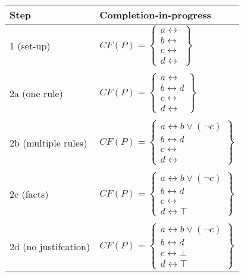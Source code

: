 \documentclass[9pt,a4paper,landscape]{article}
\begin{document}
{\begin{center}
	\begin{tabular}{p{3cm}p{5cm}}
		Step & Completion-in-progress\\ \midrule
		1 (set-up) & 	$CF(P) = \left\{\begin{array}{l}
		a \leftrightarrow  \\
		b \leftrightarrow  \\
		c \leftrightarrow  \\
		d \leftrightarrow 
		\end{array}\right\}$ \\ &\\
		2a (one rule) & 	$CF(P) = \left\{\begin{array}{l}
		a \leftrightarrow  \\
		b \leftrightarrow d \\
		c \leftrightarrow  \\
		d \leftrightarrow 
		\end{array}\right\}$ \\ &\\
		2b (multiple rules) & 	$CF(P) = \left\{\begin{array}{l}
		a \leftrightarrow b \lor (\neg c) \\
		b \leftrightarrow d \\
		c \leftrightarrow  \\
		d \leftrightarrow 
		\end{array}\right\}$ \\ &\\
		2c (facts) & 	$CF(P) = \left\{\begin{array}{l}
		a \leftrightarrow b \lor (\neg c) \\
		b \leftrightarrow d \\
		c \leftrightarrow  \\
		d \leftrightarrow \top
		\end{array}\right\}$ \\ &\\
		2d (no justifcation) & 	$CF(P) = \left\{\begin{array}{l}
		a \leftrightarrow b \lor (\neg c) \\
		b \leftrightarrow d \\
		c \leftrightarrow \bot \\
		d \leftrightarrow \top
		\end{array}\right\}$ \\
	\end{tabular}
\end{center}

}
\end{document}
